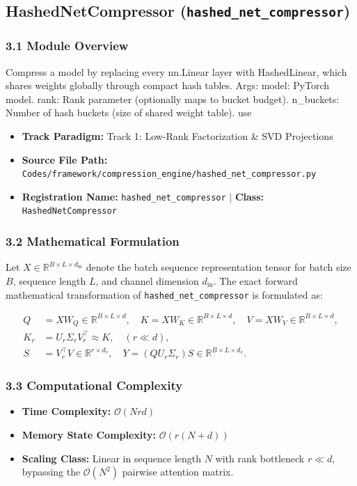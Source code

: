 \subsection{HashedNetCompressor (\texttt{hashed\_net\_compressor})}
\label{sec:app_module_hashed\_net\_compressor}

\subsubsection*{3.1 Module Overview}
Compress a model by replacing every nn.Linear layer with HashedLinear, which shares weights globally through compact hash tables.  Args:     model: PyTorch model.     rank: Rank parameter (optionally maps to bucket budget).     n\_buckets: Number of hash buckets (size of shared weight table).     use
\begin{itemize}
    \item \textbf{Track Paradigm:} Track 1: Low-Rank Factorization & SVD Projections
    \item \textbf{Source File Path:} \texttt{Codes/framework/compression\_engine/hashed\_net\_compressor.py}
    \item \textbf{Registration Name:} \texttt{hashed\_net\_compressor} $\mid$ \textbf{Class:} \texttt{HashedNetCompressor}
\end{itemize}

\subsubsection*{3.2 Mathematical Formulation}
Let $X \in \mathbb{R}^{B \times L \times d_{\text{in}}}$ denote the batch sequence representation tensor for batch size $B$, sequence length $L$, and channel dimension $d_{\text{in}}$. The exact forward mathematical transformation of \texttt{hashed\_net\_compressor} is formulated as:

\begin{align}
Q &= X W_Q \in \mathbb{R}^{B \times L \times d}, \quad K = X W_K \in \mathbb{R}^{B \times L \times d}, \quad V = X W_V \in \mathbb{R}^{B \times L \times d}, \\
K_r &= U_r \Sigma_r V_r^\top \approx K, \quad (r \ll d), \\
S &= V_r^\top V \in \mathbb{R}^{r \times d_v}, \quad Y = (Q U_r \Sigma_r) S \in \mathbb{R}^{B \times L \times d_v}.
\end{align}


\subsubsection*{3.3 Computational Complexity}
\begin{itemize}
    \item \textbf{Time Complexity:} $\mathcal{O}(N r d)$
    \item \textbf{Memory State Complexity:} $\mathcal{O}(r(N + d))$
    \item \textbf{Scaling Class:} Linear in sequence length $N$ with rank bottleneck $r \ll d$, bypassing the $\mathcal{O}(N^2)$ pairwise attention matrix.
\end{itemize}

